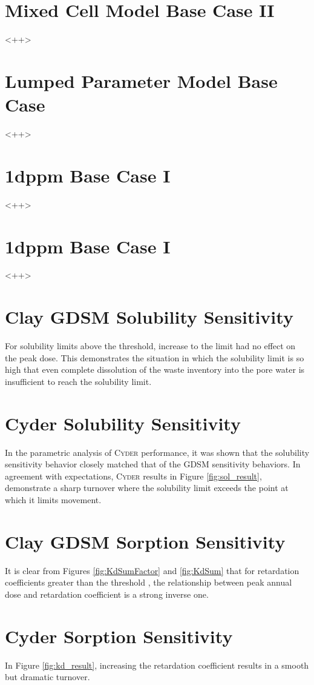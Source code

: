 \documentclass[letterpaper]{article}
\newcommand{\Cyder}{\textsc{Cyder}\xspace}
\begin{document}
\section*{Mixed Cell Model Base Case  II}
<++>
\section*{Lumped Parameter Model Base Case}
<++>
\section*{1dppm Base Case I}
<++>
\section*{1dppm Base Case I}
<++>
\section*{Clay GDSM Solubility Sensitivity}
For solubility limits above the threshold, increase to the limit had no effect on the peak dose. This demonstrates the 
situation in which the solubility limit is so high that even complete 
dissolution of the waste inventory into the pore water is insufficient to reach 
the solubility limit.
\section*{Cyder Solubility Sensitivity}
In the parametric analysis of \Cyder performance, it was shown that the 
solubility sensitivity behavior closely matched that of the GDSM 
sensitivity behaviors. In agreement with expectations, \Cyder results in Figure 
\ref{fig:sol_result}, demonstrate a sharp turnover 
where the solubility limit exceeds the point at which it limits movement. 

\section*{Clay GDSM Sorption Sensitivity}
It is clear from Figures \ref{fig:KdSumFactor} and \ref{fig:KdSum} that 
for retardation coefficients greater than the threshold , the 
relationship between peak annual dose and retardation coefficient is a strong 
inverse one. 
\section*{Cyder Sorption Sensitivity}

In Figure \ref{fig:kd_result}, increasing the retardation 
coefficient results in a smooth but dramatic turnover. 
\end{document}
